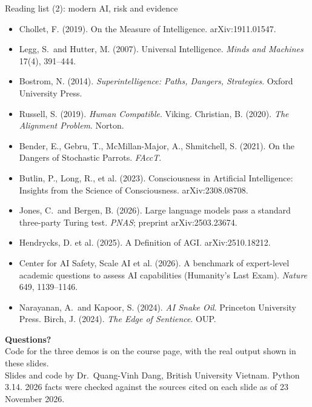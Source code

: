 \begin{frame}{Reading list (2): modern AI, risk and evidence}
\footnotesize
\begin{itemize}\setlength\itemsep{3pt}
\item Chollet, F. (2019). On the Measure of Intelligence. arXiv:1911.01547.
\item Legg, S.\ and Hutter, M. (2007). Universal Intelligence. \emph{Minds and Machines} 17(4), 391--444.
\item Bostrom, N. (2014). \emph{Superintelligence: Paths, Dangers, Strategies}. Oxford University Press.
\item Russell, S. (2019). \emph{Human Compatible}. Viking. \quad Christian, B. (2020). \emph{The Alignment Problem}. Norton.
\item Bender, E., Gebru, T., McMillan-Major, A., Shmitchell, S. (2021). On the Dangers of Stochastic Parrots. \emph{FAccT}.
\item Butlin, P., Long, R., et al. (2023). Consciousness in Artificial Intelligence: Insights from the Science of Consciousness. arXiv:2308.08708.
\item Jones, C.\ and Bergen, B. (2026). Large language models pass a standard three-party Turing test. \emph{PNAS}; preprint arXiv:2503.23674.
\item Hendrycks, D. et al. (2025). A Definition of AGI. arXiv:2510.18212.
\item Center for AI Safety, Scale AI et al. (2026). A benchmark of expert-level academic questions to assess AI capabilities (Humanity's Last Exam). \emph{Nature} 649, 1139--1146.
\item Narayanan, A.\ and Kapoor, S. (2024). \emph{AI Snake Oil}. Princeton University Press. \quad Birch, J. (2024). \emph{The Edge of Sentience}. OUP.
\end{itemize}
\end{frame}

\begin{frame}[plain]
\vfill
\begin{center}
{\Large\textbf{Questions?}}\\[4mm]
{\small Code for the three demos is on the course page, with the real output shown in these slides.}\\[4mm]
{\scriptsize Slides and code by Dr.\ Quang-Vinh Dang, British University Vietnam. Python 3.14. 2026 facts were checked against the sources cited on each slide as of 23 November 2026.}
\end{center}
\vfill
\end{frame}
